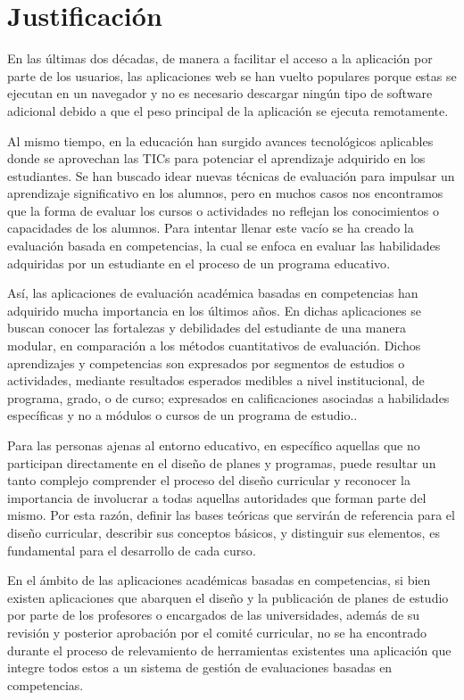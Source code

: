 \section{Justificación}
En las últimas dos décadas, de manera a facilitar el acceso a la aplicación por parte de los usuarios, las aplicaciones web se han vuelto populares porque estas se ejecutan en un navegador y no es necesario descargar ningún tipo de software adicional debido a que el peso principal de la aplicación se ejecuta remotamente\citep{net_app_architecture}.

Al mismo tiempo, en la educación han surgido avances tecnológicos aplicables donde se aprovechan las TICs para potenciar el aprendizaje adquirido en los estudiantes. Se han buscado idear nuevas técnicas de evaluación para impulsar un aprendizaje significativo en los alumnos, pero en muchos casos nos encontramos que la forma de evaluar los cursos o actividades no reflejan los conocimientos o capacidades de los alumnos. Para intentar llenar este vacío se ha creado la evaluación basada en competencias, la cual se enfoca en evaluar las habilidades adquiridas por un estudiante en el proceso de un programa educativo\citep{kuh_knowing_2014}.  

Así, las aplicaciones de evaluación académica basadas en competencias han adquirido mucha importancia en los últimos años\citep{kuh_knowing_2014}. En dichas aplicaciones se buscan conocer las fortalezas y debilidades del estudiante de una manera modular, en comparación a los métodos cuantitativos de evaluación. Dichos aprendizajes y competencias son expresados por segmentos de estudios o actividades, mediante resultados esperados medibles a nivel institucional, de programa, grado, o de curso; expresados en calificaciones asociadas a habilidades específicas y no a módulos o cursos de un programa de estudio.\citep{kuh_using_2015}.

Para las personas ajenas al entorno educativo, en específico aquellas que no participan directamente en el diseño de planes y programas, puede resultar un tanto complejo comprender el proceso del diseño curricular y reconocer la importancia de involucrar a todas aquellas autoridades que forman parte del mismo. Por esta razón, definir las bases teóricas que servirán de referencia para el diseño curricular, describir sus conceptos básicos, y distinguir sus elementos, es fundamental para el desarrollo de cada curso\citep{boyle_curriculum_2016}.

En el ámbito de las aplicaciones académicas basadas en competencias, si bien existen aplicaciones que abarquen el diseño y la publicación de planes de estudio por parte de los profesores o encargados de las universidades, además de su revisión y posterior aprobación por el comité curricular, no se ha encontrado durante el proceso de relevamiento de herramientas existentes una aplicación que integre todos estos a un sistema de gestión de evaluaciones basadas en competencias.